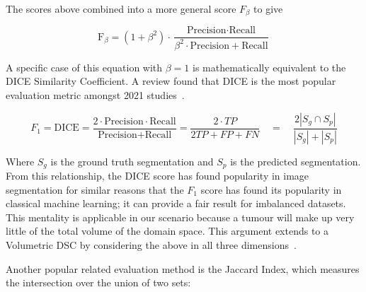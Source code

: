 \documentclass[12pt,twoside]{report}
\begin{document}
The scores above combined into a more general score $F_\beta$ to give

\begin{equation*}
 \text{F}_\beta = (1+\beta^2)\cdot \frac{\text{Precision} \cdot \text{Recall}}{\beta^2 \cdot \text{Precision}+\text{Recall}}
\end{equation*}

A specific case of this equation with $\beta=1$ is mathematically equivalent to the DICE Similarity Coefficient. A review found that DICE is the most popular evaluation metric amongst 2021 studies~\cite{review-metrics,evaluation-metrics, Sherer2021-le}.


\begin{equation*}
 F_1 = \text{DICE} = \frac{2 \cdot \text{Precision} \cdot \text{Recall}} {\text{Precision} + \text{Recall}} = \frac{2 \cdot TP}{2TP + FP + FN} \quad = \quad \frac{2|S_g\cap S_p|}{|S_g|+|S_p|}
\end{equation*}

Where $S_g$ is the ground truth segmentation and $S_p$ is the predicted segmentation. From this relationship, the DICE score has found popularity in image segmentation for similar reasons that the $F_1$ score has found its popularity in classical machine learning; it can provide a fair result for imbalanced datasets. This mentality is applicable in our scenario because a tumour will make up very little of the total volume of the domain space. This argument extends to a Volumetric DSC by considering the above in all three dimensions~\cite{APL}.

Another popular related evaluation method is the Jaccard Index, which measures the intersection over the union of two sets:
\end{document}
